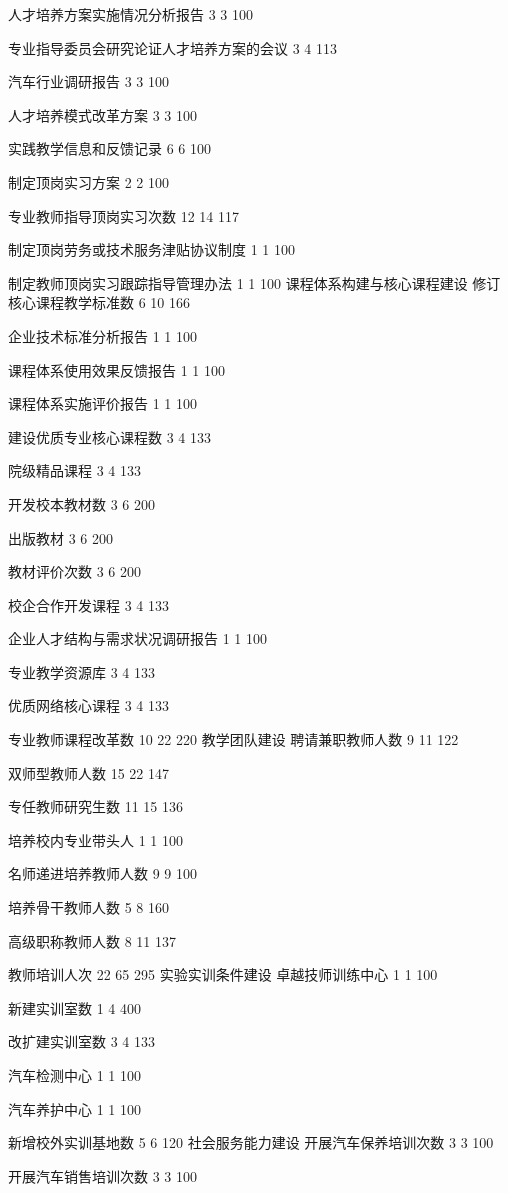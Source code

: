 人才培养方案实施情况分析报告
3
3
100%

专业指导委员会研究论证人才培养方案的会议
3
4
113%

汽车行业调研报告
3
3
100%

人才培养模式改革方案
3
3
100%

实践教学信息和反馈记录
6
6
100%

制定顶岗实习方案
2
2
100%

专业教师指导顶岗实习次数
12
14
117%

制定顶岗劳务或技术服务津贴协议制度
1
1
100%

制定教师顶岗实习跟踪指导管理办法
1
1
100%
课程体系构建与核心课程建设
修订核心课程教学标准数
6
10
166%

企业技术标准分析报告 
1
1
100%

课程体系使用效果反馈报告
1
1
100%

课程体系实施评价报告
1
1
100%

建设优质专业核心课程数
3
4
133%

院级精品课程
3
4
133%

开发校本教材数
3
6
200%

出版教材
3
6
200%

教材评价次数
3
6
200%

校企合作开发课程
3
4
133%

企业人才结构与需求状况调研报告 
1
1
100%

专业教学资源库
3
4
133%

优质网络核心课程
3
4
133%

专业教师课程改革数
10
22
220%
教学团队建设
聘请兼职教师人数
9
11
122%

双师型教师人数
15
22
147%

专任教师研究生数
11
15
136%

培养校内专业带头人
1
1
100%

名师递进培养教师人数
9
9
100%

培养骨干教师人数
5
8
160%

高级职称教师人数
8
11
137%

教师培训人次
22
65
295%
实验实训条件建设
卓越技师训练中心
1
1
100%

新建实训室数
1
4
400%

改扩建实训室数
3
4
133%

汽车检测中心
1
1
100%

汽车养护中心
1
1
100%

新增校外实训基地数
5
6
120%
社会服务能力建设
开展汽车保养培训次数
3
3
100%

开展汽车销售培训次数
3
3
100%

